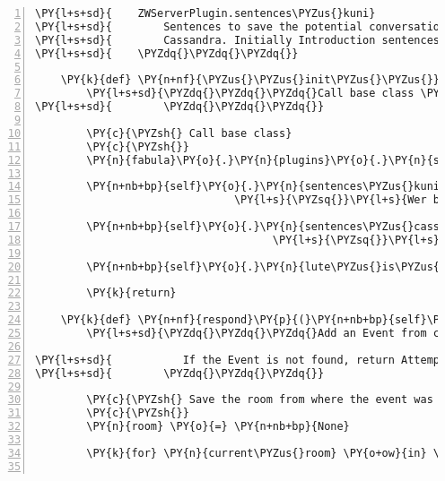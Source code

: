 \begin{Verbatim}[commandchars=\\\{\},numbers=left,firstnumber=1,stepnumber=1]
\PY{l+s+sd}{    ZWServerPlugin.sentences\PYZus{}kuni}
\PY{l+s+sd}{        Sentences to save the potential conversation possibilities with}
\PY{l+s+sd}{        Cassandra. Initially Introduction sentences.}
\PY{l+s+sd}{    \PYZdq{}\PYZdq{}\PYZdq{}}

    \PY{k}{def} \PY{n+nf}{\PYZus{}\PYZus{}init\PYZus{}\PYZus{}}\PY{p}{(}\PY{n+nb+bp}{self}\PY{p}{,} \PY{n}{host}\PY{p}{)}\PY{p}{:}
        \PY{l+s+sd}{\PYZdq{}\PYZdq{}\PYZdq{}Call base class \PYZus{}\PYZus{}init\PYZus{}\PYZus{}(), add custom logic.}
\PY{l+s+sd}{        \PYZdq{}\PYZdq{}\PYZdq{}}

        \PY{c}{\PYZsh{} Call base class}
        \PY{c}{\PYZsh{}}
        \PY{n}{fabula}\PY{o}{.}\PY{n}{plugins}\PY{o}{.}\PY{n}{serverside}\PY{o}{.}\PY{n}{DefaultGame}\PY{o}{.}\PY{n}{\PYZus{}\PYZus{}init\PYZus{}\PYZus{}}\PY{p}{(}\PY{n+nb+bp}{self}\PY{p}{,} \PY{n}{host}\PY{p}{)}

        \PY{n+nb+bp}{self}\PY{o}{.}\PY{n}{sentences\PYZus{}kuni} \PY{o}{=} \PY{p}{[}\PY{l+s}{\PYZsq{}}\PY{l+s}{Hallo, ich bin der Gnom Kuni.}\PY{l+s}{\PYZsq{}}\PY{p}{,}
                               \PY{l+s}{\PYZsq{}}\PY{l+s}{Wer bist du?}\PY{l+s}{\PYZsq{}}\PY{p}{]}

        \PY{n+nb+bp}{self}\PY{o}{.}\PY{n}{sentences\PYZus{}cassandra} \PY{o}{=} \PY{p}{[}\PY{l+s}{\PYZsq{}}\PY{l+s}{Guten Tag, ich bin die Fee Cassandra.}\PY{l+s}{\PYZsq{}}\PY{p}{,}
                                     \PY{l+s}{\PYZsq{}}\PY{l+s}{Mit wem habe ich die Ehre?}\PY{l+s}{\PYZsq{}}\PY{p}{]}

        \PY{n+nb+bp}{self}\PY{o}{.}\PY{n}{lute\PYZus{}is\PYZus{}repaired} \PY{o}{=} \PY{n+nb+bp}{False}

        \PY{k}{return}

    \PY{k}{def} \PY{n+nf}{respond}\PY{p}{(}\PY{n+nb+bp}{self}\PY{p}{,} \PY{n}{event}\PY{p}{)}\PY{p}{:}
        \PY{l+s+sd}{\PYZdq{}\PYZdq{}\PYZdq{}Add an Event from condition\PYZus{}response\PYZus{}dict corresponding to the Event given to message\PYZus{}for\PYZus{}host.}

\PY{l+s+sd}{           If the Event is not found, return AttemptFailedEvent.}
\PY{l+s+sd}{        \PYZdq{}\PYZdq{}\PYZdq{}}

        \PY{c}{\PYZsh{} Save the room from where the event was to current\PYZus{}room}
        \PY{c}{\PYZsh{}}
        \PY{n}{room} \PY{o}{=} \PY{n+nb+bp}{None}

        \PY{k}{for} \PY{n}{current\PYZus{}room} \PY{o+ow}{in} \PY{n+nb+bp}{self}\PY{o}{.}\PY{n}{host}\PY{o}{.}\PY{n}{room\PYZus{}by\PYZus{}id}\PY{o}{.}\PY{n}{values}\PY{p}{(}\PY{p}{)}\PY{p}{:}


\end{Verbatim}

